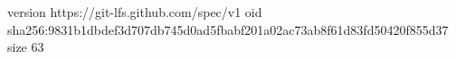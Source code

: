 version https://git-lfs.github.com/spec/v1
oid sha256:9831b1dbdef3d707db745d0ad5fbabf201a02ac73ab8f61d83fd50420f855d37
size 63
